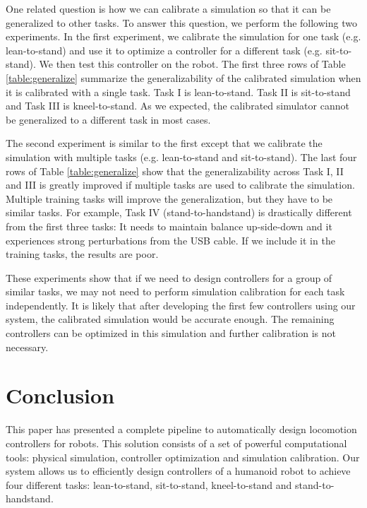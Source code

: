 
One related question is how we can calibrate a simulation so that it can be generalized to other tasks. To answer this question, we perform the following two experiments. In the first experiment, we calibrate the simulation for one task (e.g. lean-to-stand) and use it to optimize a controller for a different task (e.g. sit-to-stand). We then test this controller on the robot. The first three rows of Table \ref{table:generalize} summarize the generalizability of the calibrated simulation when it is calibrated with a single task. Task I is lean-to-stand. Task II is sit-to-stand and Task III is kneel-to-stand. As we expected, the calibrated simulator cannot be generalized to a different task in most cases.

The second experiment is similar to the first except that we calibrate the simulation with multiple tasks (e.g. lean-to-stand and sit-to-stand). The last four rows of Table \ref{table:generalize} show that the generalizability across Task I, II and III is greatly improved if multiple tasks are used to calibrate the simulation. Multiple training tasks will improve the generalization, but they have to be similar tasks. For example, Task IV (stand-to-handstand) is drastically different from the first three tasks: It needs to maintain balance up-side-down and it experiences strong perturbations from the USB cable. If we include it in the training tasks, the results are poor.

These experiments show that if we need to design controllers for a group of similar tasks, we may not need to perform simulation calibration for each task independently. It is likely that after developing the first few controllers using our system, the calibrated simulation would be accurate enough. The remaining controllers can be optimized in this simulation and further calibration is not necessary.

\section{Conclusion}

This paper has presented a complete pipeline to automatically design locomotion controllers for robots. This solution consists of a set of powerful computational tools: physical simulation, controller optimization and simulation calibration. Our system allows us to efficiently design controllers of a humanoid robot to achieve four different tasks: lean-to-stand, sit-to-stand, kneel-to-stand and stand-to-handstand.

